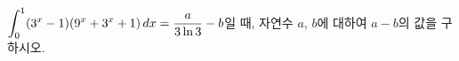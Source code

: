 $\displaystyle\int_{0}^{1}(3^x-1)(9^x+3^x+1)\mkern3mu dx=\dfrac{a}{3\ln 3}-b$일 때, 자연수 $a$, $b$에 대하여 $a-b$의 값을 구하시오.
